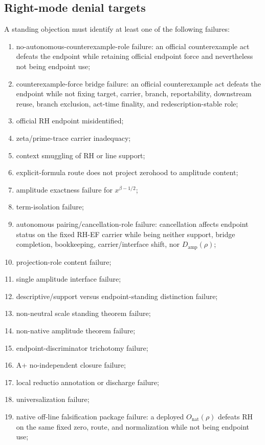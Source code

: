 \documentclass[11pt]{article}
\newcommand{\Damp}{D_{\mathrm{amp}}}
\newcommand{\Onat}{O_{\mathrm{nat}}}
\begin{document}
\subsection{Right-mode denial targets}

A standing objection must identify at least one of the following failures:
\begin{enumerate}
\item no-autonomous-counterexample-role failure: an official counterexample act defeats the endpoint while retaining official endpoint force and nevertheless not being endpoint use;
\item counterexample-force bridge failure: an official counterexample act defeats the endpoint while not fixing target, carrier, branch, reportability, downstream reuse, branch exclusion, act-time finality, and redescription-stable role;
\item official RH endpoint misidentified;
\item zeta/prime-trace carrier inadequacy;
\item context smuggling of RH or line support;
\item explicit-formula route does not project zerohood to amplitude content;
\item amplitude exactness failure for \(x^{\beta-1/2}\);
\item term-isolation failure;
\item autonomous pairing/cancellation-role failure: cancellation affects endpoint status on the fixed RH-EF carrier while being neither support, bridge completion, bookkeeping, carrier/interface shift, nor \(\Damp(\rho)\);
\item projection-role content failure;
\item single amplitude interface failure;
\item descriptive/support versus endpoint-standing distinction failure;
\item non-neutral scale standing theorem failure;
\item non-native amplitude theorem failure;
\item endpoint-discriminator trichotomy failure;
\item A+ no-independent closure failure;
\item local reductio annotation or discharge failure;
\item universalization failure;
\item native off-line falsification package failure: a deployed \(\Onat(\rho)\) defeats RH on the same fixed zero, route, and normalization while not being endpoint use;

\end{enumerate}
\end{document}
